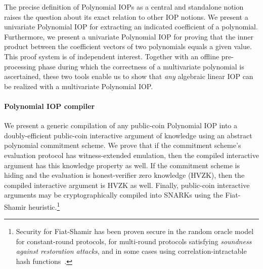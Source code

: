 The precise definition of Polynomial IOPs as a central and standalone notion raises the question about its exact relation to other IOP notions. We present a univariate Polynomial IOP for extracting an indicated coefficient of a polynomial. 
Furthermore, we present a univariate Polynomial IOP for proving that the inner product between the coefficient vectors of two polynomials equals a given value. This proof system is of independent interest. Together with an offline pre-processing phase during which the correctness of a multivariate polynomial is ascertained, these two tools enable us to show that \emph{any} algebraic linear IOP can be realized with a multivariate Polynomial IOP.

\paragraph{Polynomial IOP compiler} 
We present a generic compilation of any public-coin Polynomial IOP into a doubly-efficient public-coin interactive argument of knowledge using an abstract polynomial commitment scheme. We prove that if the commitment scheme's evaluation protocol has witness-extended emulation, then the compiled interactive argument has this knowledge property as well. If the commitment scheme is hiding and the evaluation is honest-verifier zero knowledge (HVZK), then the compiled interactive argument is HVZK as well. Finally, public-coin interactive arguments may be cryptographically compiled into SNARKs using the Fiat-Shamir heuristic.\footnote{Security for Fiat-Shamir has been proven secure in the random oracle model for constant-round protocols, for multi-round protocols satisfying \emph{soundness against restoration attacks}, and in some cases using correlation-intractable hash functions~\cite{C:FiaSha86,TCC:BenChiSpo16,C:KalRotRot17,EC:CCRR18,STOC:CCHLRRW19}.}

